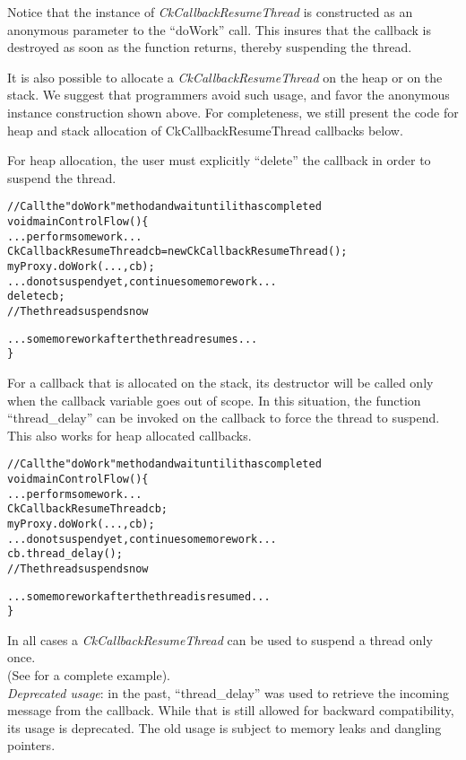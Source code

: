 Notice that the instance of {\em CkCallbackResumeThread} is constructed
as an anonymous parameter to the ``doWork'' call. This insures that the callback
is destroyed as soon as the function returns, thereby suspending the thread.

It is also possible to allocate a {\em CkCallbackResumeThread} on the heap or on
the stack. We suggest that programmers avoid such usage, and favor the anonymous instance construction
shown above. For completeness, we still present the code for heap and stack
allocation of CkCallbackResumeThread callbacks below.

For heap allocation, the user must explicitly ``delete'' the callback in order to
suspend the thread.

\begin{alltt}
// Call the "doWork" method and wait until it has completed
void mainControlFlow() \{
  ...perform some work...
  CkCallbackResumeThread cb = new CkCallbackResumeThread();
  myProxy.doWork(...,cb);
  ...do not suspend yet, continue some more work...
  delete cb;
  // The thread suspends now

  ...some more work after the thread resumes...
\}
\end{alltt}

For a callback that is allocated on the stack, its destructor will be called only
when the callback variable goes out of scope. In this
situation, the function ``thread\_delay'' can be invoked on the callback to
force the thread to suspend. This also works for heap allocated callbacks.

\begin{alltt}
// Call the "doWork" method and wait until it has completed
void mainControlFlow() \{
  ...perform some work...
  CkCallbackResumeThread cb;
  myProxy.doWork(...,cb);
  ...do not suspend yet, continue some more work...
  cb.thread\_delay();
  // The thread suspends now

  ...some more work after the thread is resumed...
\}
\end{alltt}

In all cases a {\em CkCallbackResumeThread} can be used to suspend a thread
only once.\\
(See  for a complete example).\\
{\em Deprecated usage}: in the past, ``thread\_delay'' was used to retrieve the
incoming message from the callback. While that is still allowed for backward
compatibility, its usage is deprecated. The old usage is subject to memory
leaks and dangling pointers.

